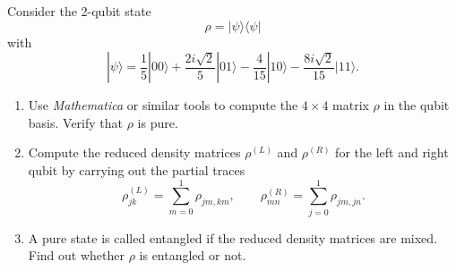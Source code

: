 \begin{Problem}
	Consider the 2-qubit state
	\[
	\rho = |\psi\rangle\langle\psi|
	\]
	with
	\[
	|\psi\rangle
	=
	\frac15|00\rangle
	+
	\frac{2i\sqrt2}{5}|01\rangle
	-
	\frac{4}{15}|10\rangle
	-
	\frac{8i\sqrt2}{15}|11\rangle.
	\]
	
	\begin{enumerate}
		\item[(a)]
		Use \emph{Mathematica} or similar tools to compute the $4\times4$
		matrix $\rho$ in the qubit basis.
		Verify that $\rho$ is pure.
		
		\item[(b)]
		Compute the reduced density matrices
		$\rho^{(L)}$ and $\rho^{(R)}$
		for the left and right qubit by carrying out the partial traces
		\[
		\rho^{(L)}_{jk}
		=
		\sum_{m=0}^{1}
		\rho_{jm,km},
		\qquad
		\rho^{(R)}_{mn}
		=
		\sum_{j=0}^{1}
		\rho_{jm,jn}.
		\]
		
		\item[(c)]
		A pure state is called entangled if the reduced density matrices are
		mixed.
		Find out whether $\rho$ is entangled or not.
	\end{enumerate}
\end{Problem}
